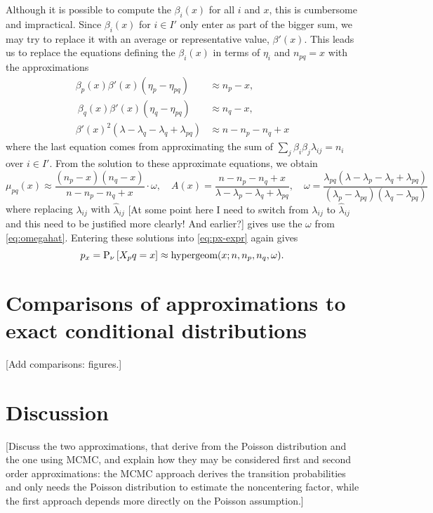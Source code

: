 \documentclass{myaptpub}%
\newcommand\Prob{\sP}
\newcommand\Prt[1]{\Prob_\nu\left[#1\right]}%
\newcommand\NB[1]{{\color{red}[#1]}}
\begin{document}
Although it is possible to compute the $\beta_i(x)$ for all $i$ and $x$, this is cumbersome and impractical. Since $\beta_i(x)$ for $i\in I'$ only enter as part of the bigger sum, we may try to replace it with an average or representative value, $\beta'(x)$. This leads us to replace the equations defining the $\beta_i(x)$ in terms of $\eta_i$ and $n_{pq}=x$ with the approximations
\begin{equation}\nonumber
\begin{split}
\beta_p(x)\beta'(x)(\eta_p-\eta_{pq})&\approx n_p-x,
\\\
\beta_q(x)\beta'(x)(\eta_q-\eta_{pq})&\approx n_q-x,
\\
\beta'(x)^2(\lambda-\lambda_q-\lambda_q+\lambda_{pq})&\approx n-n_p-n_q+x
\end{split}
\end{equation}
where the last equation comes from approximating the sum of $\sum_j\beta_i\beta_j\lambda_{ij}=n_i$ over $i\in I'$. From the solution to these approximate equations, we obtain
\begin{equation}\nonumber
\mu_{pq}(x)\approx\frac{(n_p-x)(n_q-x)}{n-n_p-n_q+x}\cdot\omega,
\quad
A(x)=\frac{n-n_p-n_q+x}{\lambda-\lambda_p-\lambda_q+\lambda_{pq}},
\quad
\omega=\frac{\lambda_{pq}(\lambda-\lambda_p-\lambda_q+\lambda_{pq})}{(\lambda_p-\lambda_{pq})(\lambda_q-\lambda_{pq})}
\end{equation}
where replacing $\lambda_{ij}$ with $\hat\lambda_{ij}$
\NB{At some point here I need to switch from $\lambda_{ij}$ to $\hat\lambda_{ij}$ and this need to be justified more clearly! And earlier?}
gives use the $\omega$ from \eqref{eq:omegahat}. Entering these solutions into \eqref{eq:px-expr} again gives
\begin{equation}\nonumber
p_x=\Prt{X_pq=x}\approx\textrm{hypergeom}(x;n,n_p,n_q,\omega).
\end{equation}


\section{Comparisons of approximations to exact conditional distributions}

\NB{Add comparisons: figures.}


\section{Discussion}

\NB{Discuss the two approximations, that derive from the Poisson distribution and the one using MCMC, and explain how they may be considered first and second order approximations: the MCMC approach derives the transition probabilities and only needs the Poisson distribution to estimate the noncentering factor, while the first approach depends more directly on the Poisson assumption.}
\end{document}
